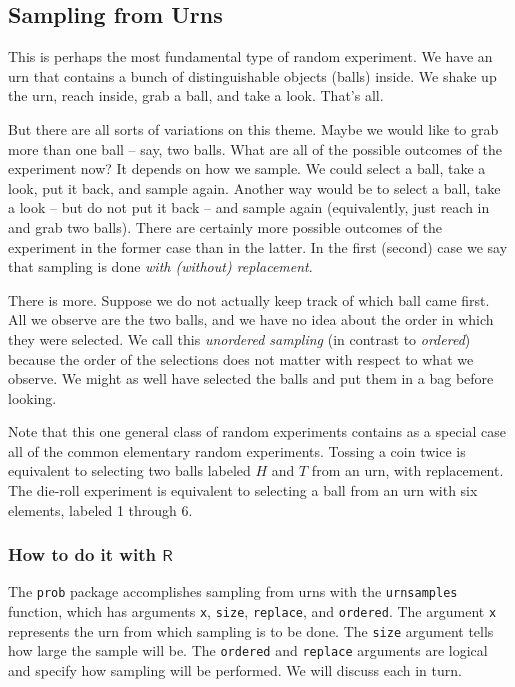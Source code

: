 \subsection{Sampling from Urns}
\label{sec-4-1-2}

This is perhaps the most fundamental type of random experiment. We
have an urn that contains a bunch of distinguishable objects (balls)
inside. We shake up the urn, reach inside, grab a ball, and take a
look. That's all.

But there are all sorts of variations on this theme. Maybe we would
like to grab more than one ball -- say, two balls. What are all of the
possible outcomes of the experiment now? It depends on how we
sample. We could select a ball, take a look, put it back, and sample
again. Another way would be to select a ball, take a look -- but do
not put it back -- and sample again (equivalently, just reach in and
grab two balls). There are certainly more possible outcomes of the
experiment in the former case than in the latter. In the first
(second) case we say that sampling is done \emph{with (without)
replacement}.

There is more. Suppose we do not actually keep track of which ball
came first. All we observe are the two balls, and we have no idea
about the order in which they were selected. We call this \emph{unordered
sampling} (in contrast to \emph{ordered}) because the order of the
selections does not matter with respect to what we observe. We might
as well have selected the balls and put them in a bag before looking.

Note that this one general class of random experiments contains as a
special case all of the common elementary random experiments. Tossing
a coin twice is equivalent to selecting two balls labeled \(H\) and
\(T\) from an urn, with replacement. The die-roll experiment is
equivalent to selecting a ball from an urn with six elements, labeled
1 through 6.

\subsubsection{How to do it with \(\mathsf{R}\)}
\label{sec-4-1-2-1}

The \texttt{prob} package \cite{prob} accomplishes sampling from urns with
the \texttt{urnsamples} 
function, which has arguments \texttt{x}, \texttt{size}, \texttt{replace}, and
\texttt{ordered}. The argument \texttt{x} represents the urn from which sampling is
to be done. The \texttt{size} argument tells how large the sample will
be. The \texttt{ordered} and \texttt{replace} arguments are logical and specify how
sampling will be performed. We will discuss each in turn.

